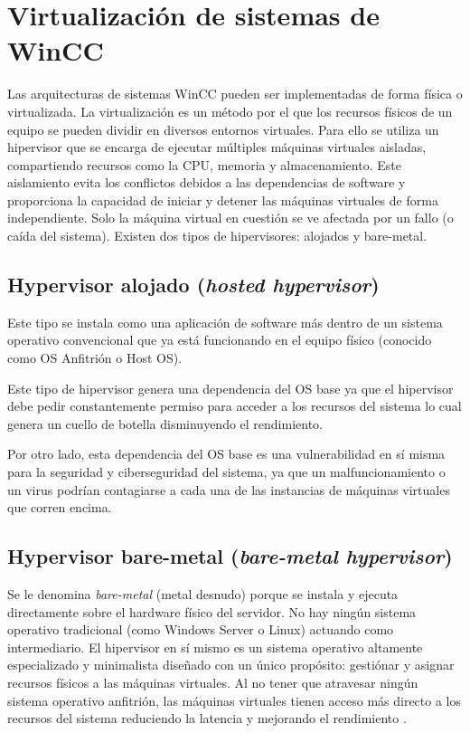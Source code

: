\section{Virtualización de sistemas de WinCC}
Las arquitecturas de sistemas WinCC  pueden ser implementadas de forma física o virtualizada. La virtualización es un método por el que los recursos físicos de un equipo se pueden dividir en diversos entornos virtuales. Para ello se utiliza un hipervisor que se encarga de ejecutar múltiples máquinas virtuales  aisladas, compartiendo recursos como la \ac{CPU}, memoria y almacenamiento. Este aislamiento evita los conflictos debidos a las dependencias de software y proporciona la capacidad de iniciar y detener las máquinas virtuales de forma independiente. Solo la máquina virtual en cuestión se ve afectada por un fallo (o caída del sistema). Existen dos tipos de hipervisores: alojados y bare-metal.
\subsection{Hypervisor alojado  (\textit{hosted hypervisor})}
Este tipo se instala como una aplicación de software más dentro de un sistema operativo convencional que ya está funcionando en el equipo físico (conocido como \ac{OS} Anfitrión o Host \ac{OS}).\par

Este tipo de hipervisor genera una dependencia del \ac{OS} base ya que el hipervisor debe pedir constantemente permiso para acceder a los recursos del sistema lo cual genera un cuello de botella disminuyendo el rendimiento. \par

Por otro lado, esta dependencia del \ac{OS} base es una vulnerabilidad en sí misma para la seguridad y ciberseguridad del sistema, ya que un malfuncionamiento o un virus podrían contagiarse a cada una de las instancias de máquinas virtuales que corren encima.

\subsection{Hypervisor bare-metal (\textit{bare-metal hypervisor})}

Se le denomina \textit{bare-metal} (metal desnudo) porque se instala y ejecuta directamente sobre el hardware físico del servidor. No hay ningún sistema operativo tradicional (como Windows Server o Linux) actuando como intermediario. El hipervisor en sí mismo es un sistema operativo altamente especializado y minimalista diseñado con un único propósito: gestiónar y asignar recursos físicos a las máquinas virtuales. Al no tener que atravesar ningún sistema operativo anfitrión, las máquinas virtuales tienen acceso más directo a los recursos del sistema reduciendo la latencia y mejorando el rendimiento \cite{wen2023baremetal}. \par

